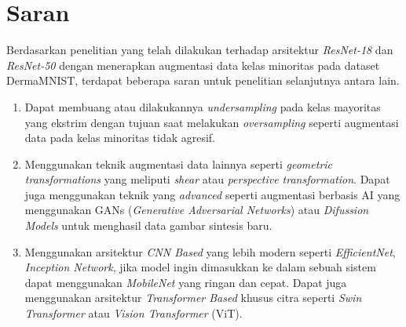\section{Saran} \label{V.Saran}
Berdasarkan penelitian yang telah dilakukan terhadap arsitektur 
\textit{ResNet-18} dan \textit{ResNet-50} dengan menerapkan augmentasi 
data kelas minoritas pada dataset DermaMNIST, terdapat beberapa saran 
untuk penelitian selanjutnya antara lain. \par

\begin{enumerate}[noitemsep]
    \item Dapat membuang atau dilakukannya \textit{undersampling} pada 
    kelas mayoritas yang ekstrim dengan tujuan saat melakukan 
    \textit{oversampling} seperti augmentasi data pada kelas minoritas 
    tidak agresif.

    \item Menggunakan teknik augmentasi data lainnya seperti 
    \textit{geometric transformations} yang meliputi \textit{shear} atau 
    \textit{perspective transformation}. Dapat juga menggunakan teknik 
    yang \textit{advanced} seperti augmentasi berbasis AI yang menggunakan 
    GANs (\textit{Generative Adversarial Networks}) atau \textit{Difussion 
    Models} untuk menghasil data gambar sintesis baru. 

    \item Menggunakan arsitektur \textit{CNN Based} yang lebih modern 
    seperti \textit{EfficientNet}, \textit{Inception Network}, jika model 
    ingin dimasukkan ke dalam sebuah sistem dapat menggunakan 
    \textit{MobileNet} yang ringan dan cepat. Dapat juga menggunakan 
    arsitektur \textit{Transformer Based} khusus citra seperti 
    \textit{Swin Transformer} atau \textit{Vision Transformer} (ViT).
\end{enumerate}

